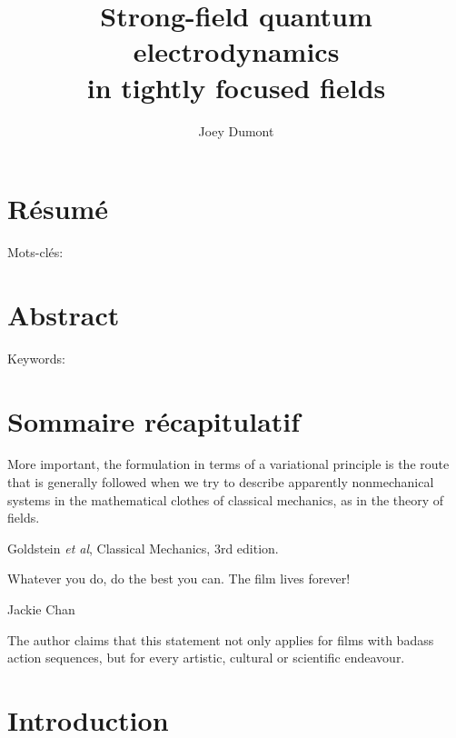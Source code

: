 \documentclass[11pt,SymmetricalJury]{inrsthesis/inrsthesis}
\title{Strong-field quantum electrodynamics \\ in tightly focused fields}
\author{Joey Dumont}
\begin{document}
\frontmatter

\maketitle

\chapter{Résumé}

Mots-clés:

\chapter{Abstract}

Keywords:

\chapter{Sommaire récapitulatif}
\cleardoublepage

\tableofcontents
\cleardoublepage

\listoftables
\cleardoublepage

\listoffigures
\cleardoublepage


\epigraph{More important, the formulation in terms of a variational principle is the route
          that is generally followed when we try to describe apparently nonmechanical systems
          in the mathematical clothes of classical mechanics, as in the theory of fields.}{Goldstein \textit{et al}, Classical Mechanics, 3rd edition.}
\cleardoublepage

\epigraph{Whatever you do, do the best you can. The film lives forever!}{Jackie Chan}

\begin{flushright}
\begin{minipage}{0.35\textwidth}
The author claims that this statement not only applies for films with badass
action sequences, but for every artistic, cultural or scientific endeavour.
\end{minipage}
\end{flushright}

\cleardoublepage
\mainmatter

\chapter{Introduction}
\end{document}
